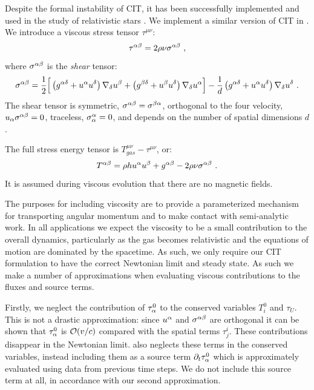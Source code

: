 Despite the formal instability of CIT, it has been successfully implemented and used in the study of relativistic stars \citep{Duez04}.  We implement a similar version of CIT in \grdisco.  We introduce a viscous stress tensor $\tau^{\mu\nu}$:
\begin{equation}
	\tau^{\alpha \beta} = 2 \rho \nu \sigma^{\alpha \beta} \ ,
\end{equation}
where $\sigma^{\alpha \beta}$ is the \emph{shear} tensor:
\begin{equation}
	\sigma^{\alpha \beta} = \frac{1}{2}\Big[\left(g^{\alpha \delta} + u^\alpha u^\delta\right)\nabla_\delta u^\beta +  \left(g^{\beta \delta} + u^\beta u^\delta\right)\nabla_\delta u^\alpha\Big] - \frac{1}{d}\left(g^{\alpha \delta} + u^\alpha u^\delta\right)\nabla_\delta u^\delta\ .
\end{equation}
The shear tensor is symmetric, $\sigma^{\alpha \beta} = \sigma^{\beta \alpha}$, orthogonal to the four velocity, $u_\alpha \sigma^{\alpha \beta} = 0$, traceless, $\sigma^\alpha_\alpha = 0$, and depends on the number of spatial dimensions $d$.

The full stress energy tensor is $T^{\mu\nu}_{gas} - \tau^{\mu\nu}$, or:
\begin{equation}
	T^{\alpha \beta} = \rho h u^\alpha u^\beta + g^{\alpha\beta} - 2 \rho \nu \sigma^{\alpha \beta}\ .
\end{equation}
It is assumed during viscous evolution that there are no magnetic fields.

The purposes for including viscosity are to provide a parameterized mechanism for transporting angular momentum and to make contact with semi-analytic work.  In all applications we expect the viscosity to be a small contribution to the overall dynamics, particularly as the gas becomes relativistic and the equations of motion are dominated by the spacetime.  As such, we only require our CIT formulation to have the correct Newtonian limit and steady state.  As such we make a number of approximations when evaluating viscous contributions to the fluxes and source terms.

Firstly, we neglect the contribution of $\tau^0_\alpha$ to the conserved variables $T^0_i$ and $\tau_U$.  This is not a drastic approximation: since $u^\alpha$ and $\sigma^{\alpha \beta}$ are orthogonal it can be shown that $\tau^0_\alpha$ is $\mathcal{O}(v/c)$ compared with the spatial terms $\tau^i_j$.  These contributions disappear in the Newtonian limit.  \citet{Duez04} also neglects these terms in the conserved variables, instead including them as a source term $\partial_t \tau^0_\alpha$ which is approximately evaluated using data from previous time steps.  We do not include this source term at all, in accordance with our second approximation.

